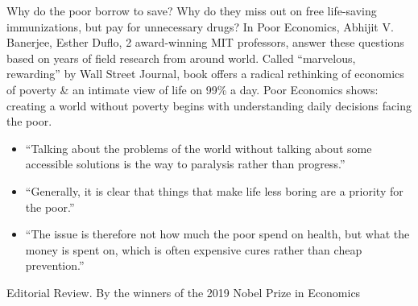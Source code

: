 \documentclass{article}
\begin{document}
\begin{enumerate}
	Why do the poor borrow to save? Why do they miss out on free life-saving immunizations, but pay for unnecessary drugs? In Poor Economics, {\sc Abhijit V. Banerjee, Esther Duflo}, 2 award-winning MIT professors, answer these questions based on years of field research from around world. Called ``marvelous, rewarding'' by Wall Street Journal, book offers a radical rethinking of economics of poverty \& an intimate view of life on 99\% a day. Poor Economics shows: creating a world without poverty begins with understanding daily decisions facing the poor.
	\begin{itemize}
		\item ``Talking about the problems of the world without talking about some accessible solutions is the way to paralysis rather than progress.''
		\item ``Generally, it is clear that things that make life less boring are a priority for the poor.''
		\item ``The issue is therefore not how much the poor spend on health, but what the money is spent on, which is often expensive cures rather than cheap prevention.''
	\end{itemize}	
	{\sf Editorial Review.} By the winners of the 2019 Nobel Prize in Economics
	

\end{enumerate}
\end{document}
